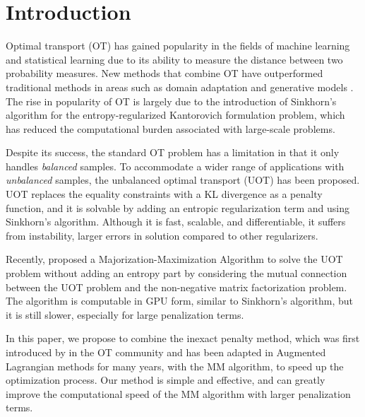 \maketitle

\section{Introduction}
\label{sec:int}

Optimal transport (OT) has gained popularity in the fields of machine learning and statistical learning due to its ability to measure the distance between two probability measures. New methods that combine OT have outperformed traditional methods in areas such as domain adaptation \cite{Courty_PAMI_2017} and generative models \cite{arjovsky2017wasserstein}. The rise in popularity of OT is largely due to the introduction of Sinkhorn's algorithm \cite{Cuturi_NIPS_2013} for the entropy-regularized Kantorovich formulation problem, which has reduced the computational burden associated with large-scale problems.

Despite its success, the standard OT problem has a limitation in that it only handles {\it balanced} samples. To accommodate a wider range of applications with {\it unbalanced} samples, the unbalanced optimal transport (UOT) \cite{Caffarelli_AM_2010,chizat2017scaling} has been proposed. UOT replaces the equality constraints with a KL divergence as a penalty function, and it is solvable by adding an entropic regularization term and using Sinkhorn's algorithm. Although it is fast, scalable, and differentiable, it suffers from instability, larger errors in solution compared to other regularizers.

Recently, \cite{Chapel_NeurIPS_2021} proposed a Majorization-Maximization Algorithm to solve the UOT problem without adding an entropy part by considering the mutual connection between the UOT problem and the non-negative matrix factorization problem. The algorithm is computable in GPU form, similar to Sinkhorn's algorithm, but it is still slower, especially for large penalization terms.

In this paper, we propose to combine the inexact penalty method, which was first introduced by \cite{pmlr-v115-xie20b} in the OT community and has been adapted in Augmented Lagrangian methods for many years, with the MM algorithm, to speed up the optimization process. Our method is simple and effective, and can greatly improve the computational speed of the MM algorithm with larger penalization terms.

